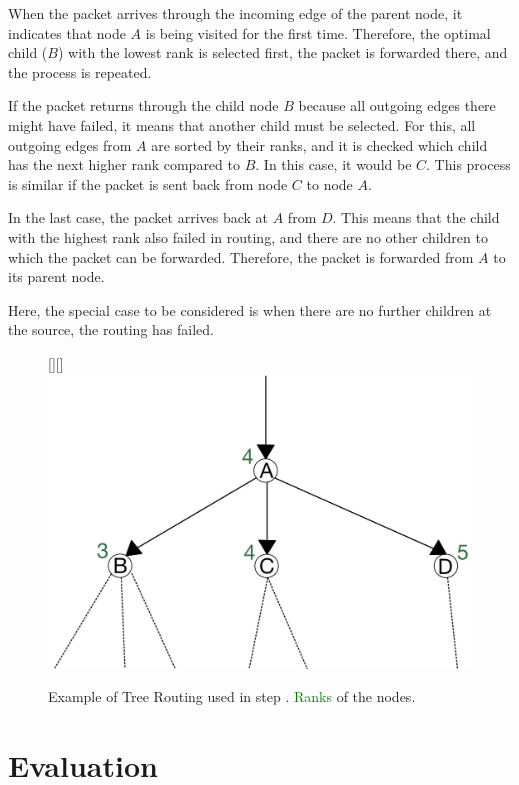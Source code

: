 \documentclass[conference]{IEEEtran}
\begin{document}
When the packet arrives through the incoming edge of the parent node, it indicates that node $A$ is being visited for the first time. Therefore, the optimal child ($B$) with the lowest rank is selected first, the packet is forwarded there, and the process is repeated.

If the packet returns through the child node $B$ because all outgoing edges there might have failed, it means that another child must be selected. For this, all outgoing edges from $A$ are sorted by their ranks, and it is checked which child has the next higher rank compared to $B$. In this case, it would be $C$. This process is similar if the packet is sent back from node $C$ to node $A$.

In the last case, the packet arrives back at $A$ from $D$. This means that the child with the highest rank also failed in routing, and there are no other children to which the packet can be forwarded. Therefore, the packet is forwarded from $A$ to its parent node.

Here, the special case to be considered is when there are no further children at the source, the routing has failed.


\begin{figure}[t]
    \centering
    \raisebox{0pt}[\height][\depth]{\hspace*{-1cm}\includegraphics[scale=0.15]{figures/treeRoutingExample.jpg}}
    \caption{Example of Tree Routing used in step . \textcolor{green}{Ranks} of the nodes.}

    \label{treeRoutingExample}
\end{figure}

\section{Evaluation}
\label{evaluation}
\end{document}
